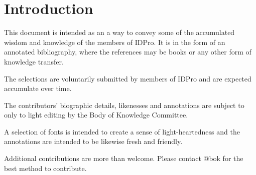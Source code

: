 \section{Introduction}
This document is intended as an a way to convey some of the accumulated wisdom and knowledge of the members of IDPro. 
It is in the form of an annotated bibliography, where the references may be books or any other form of knowledge transfer.

The selections are voluntarily submitted by members of IDPro and are expected accumulate over time. 

The contributors' biographic details,  likenesses and annotations are subject to only to light editing by the Body of Knowledge Committee.

A selection of fonts is intended to create a sense of light-heartedness and the annotations are intended to be likewise fresh and friendly.

Additional contributions are more than welcome.  Please contact @bok for the best method to contribute.